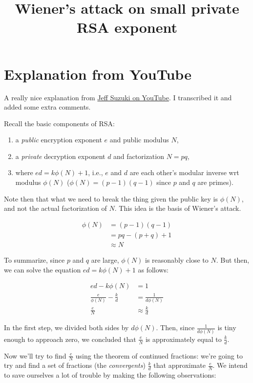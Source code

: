 \documentclass{article}
\title{Wiener's attack on small private RSA exponent}
\begin{document}
\maketitle

\section{Explanation from YouTube}

A really nice explanation from \href{https://www.youtube.com/watch?v=OpPrrndyYNU}{Jeff Suzuki on YouTube}. I transcribed it and added some extra comments. \medskip

Recall the basic components of RSA: 

\begin{enumerate}
    \item a \emph{public} encryption exponent $e$ and public modulus $N$,
    \item a \emph{private} decryption exponent $d$ and factorization $N=pq$,
    \item where $ed=k\phi(N)+1$, i.e., $e$ and $d$ are each other's modular inverse wrt modulus $\phi(N)$ ($\phi(N)=(p-1)(q-1)$ since $p$ and $q$ are primes).
\end{enumerate}

Note then that what we need to break the thing given the public key is $\phi(N)$, and not the actual factorization of $N$. This idea is the basis of Wiener's attack.

\begin{align*}
    \phi(N) &= (p-1)(q-1)\\
     &= pq-(p+q)+1\\
     &\approx N
\end{align*}

To summarize, since $p$ and $q$ are large, $\phi(N)$ is reasonably close to $N$. But then, we can solve the equation $ed=k\phi(N)+1$ as follows:

\begin{align*}
    ed - k\phi(N) &= 1\\
     \frac{e}{\phi(N)}-\frac{k}{d}&=\frac{1}{d\phi(N)}\\
     \frac{e}{N}&\approx \frac{k}{d}
\end{align*}

In the first step, we divided both sides by $d\phi(N)$. Then, since $\frac{1}{d\phi(N)}$ is tiny enough to approach zero, we concluded that $\frac{e}{N}$ is approximately equal to $\frac{k}{d}$. \medskip

Now we'll try to find $\frac{e}{N}$ using the theorem of continued fractions: we're going to try and find a set of fractions (the \emph{convergents}) $\frac{k}{d}$ that approximate $\frac{e}{N}$. We intend to save ourselves a lot of trouble by making the following observations:
\end{document}
